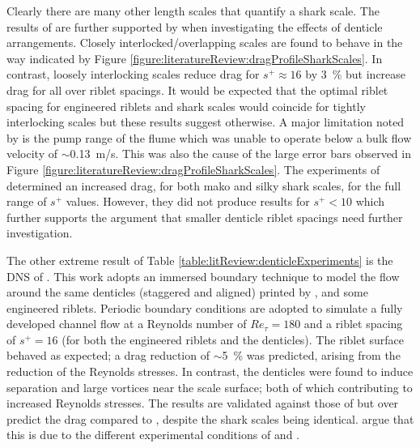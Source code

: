 \documentclass[12pt,oneside,a4paper]{article}
\begin{document}
%
Clearly there are many other length scales that quantify a shark scale. The results of \cite{wen2014} are further supported by \cite{wen2015} when investigating the effects of denticle arrangements. Closely interlocked/overlapping scales are found to behave in the way indicated by Figure \ref{figure:literatureReview:dragProfileSharkScales}. In contrast, loosely interlocking scales reduce drag for $s^+ \approx 16$ by \SI{3}{\%} but increase drag for all over riblet spacings. It would be expected that the optimal riblet spacing for engineered riblets and shark scales would coincide for tightly interlocking scales but these results suggest otherwise. A major limitation noted by \cite{wen2014} is the pump range of the flume which was unable to operate below a bulk flow velocity of $\sim$\SI{0.13}{m/s}. This was also the cause of the large error bars observed in Figure \ref{figure:literatureReview:dragProfileSharkScales}. The experiments of \cite{bechert1985} determined an increased drag, for both mako and silky shark scales, for the full range of $s^+$ values. However, they did not produce results for $s^+<10$ which further supports the argument that smaller denticle riblet spacings need further investigation.

The other extreme result of Table \ref{table:litReview:denticleExperiments} is the DNS of \cite{boomsma2016}. This work adopts an immersed boundary technique to model the flow around the same denticles (staggered and aligned) printed by \cite{wen2014,wen2015}, and some engineered riblets. Periodic boundary conditions are adopted to simulate a fully developed channel flow at a Reynolds number of $Re_\tau = 180$ and a riblet spacing of $s^+=16$ (for both the engineered riblets and the denticles). The riblet surface behaved as expected; a drag reduction of $\sim$\SI{5}{\%} was predicted, arising from the reduction of the Reynolds stresses. In contrast, the denticles were found to induce separation and large vortices near the scale surface; both of which contributing to increased Reynolds stresses. The results are validated against those of \cite{bechert1985} but over predict the drag compared to \cite{wen2014,wen2015}, despite the shark scales being identical. \cite{boomsma2016} argue that this is due to the different experimental conditions of \cite{wen2014} and \cite{bechert1985}.
\end{document}
